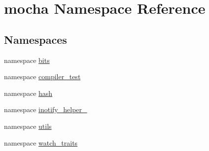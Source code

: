 \hypertarget{namespacemocha}{
\section{mocha Namespace Reference}
\label{namespacemocha}
}
\subsection*{Namespaces}
\begin{DoxyCompactItemize}
\item 
namespace \hyperlink{namespacemocha_1_1bits}{bits}
\item 
namespace \hyperlink{namespacemocha_1_1compiler__test}{compiler\_\-test}
\item 
namespace \hyperlink{namespacemocha_1_1hash}{hash}
\item 
namespace \hyperlink{namespacemocha_1_1inotify__helper__}{inotify\_\-helper\_\-}
\item 
namespace \hyperlink{namespacemocha_1_1utils}{utils}
\item 
namespace \hyperlink{namespacemocha_1_1watch__traits}{watch\_\-traits}
\end{DoxyCompactItemize}
